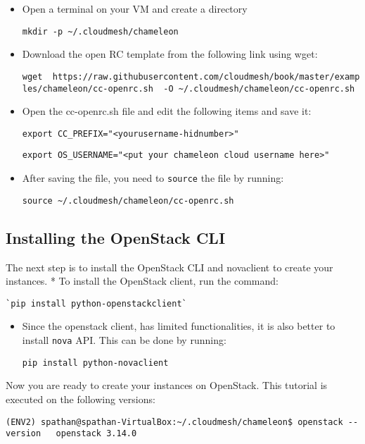 \begin{itemize}
\item
  Open a terminal on your VM and create a directory

  \texttt{mkdir\ -p\ \textasciitilde{}/.cloudmesh/chameleon}
\item
  Download the open RC template from the following link using wget:

  \texttt{wget\ \ https://raw.githubusercontent.com/cloudmesh/book/master/examples/chameleon/cc-openrc.sh\ \ -O\ \textasciitilde{}/.cloudmesh/chameleon/cc-openrc.sh}
\item
  Open the cc-openrc.sh file and edit the following items and save it:

  \texttt{export\ CC\_PREFIX="\textless{}yourusername-hidnumber\textgreater{}"}

  \texttt{export\ OS\_USERNAME="\textless{}put\ your\ chameleon\ cloud\ username\ here\textgreater{}"}
\item
  After saving the file, you need to \texttt{source} the file by
  running:

  \texttt{source\ \textasciitilde{}/.cloudmesh/chameleon/cc-openrc.sh}
\end{itemize}

\subsection{Installing the OpenStack CLI}

The next step is to install the OpenStack CLI and novaclient to create
your instances. * To install the OpenStack client, run the command:

\begin{lstlisting}
`pip install python-openstackclient`
\end{lstlisting}

\begin{itemize}
\item
  Since the openstack client, has limited functionalities, it is also
  better to install \texttt{nova} API. This can be done by running:

  \texttt{pip\ install\ python-novaclient}
\end{itemize}

Now you are ready to create your instances on OpenStack. This tutorial
is executed on the following versions:

\texttt{(ENV2)\ spathan@spathan-VirtualBox:\textasciitilde{}/.cloudmesh/chameleon\$\ openstack\ -\/-version\ \ \ openstack\ 3.14.0}

